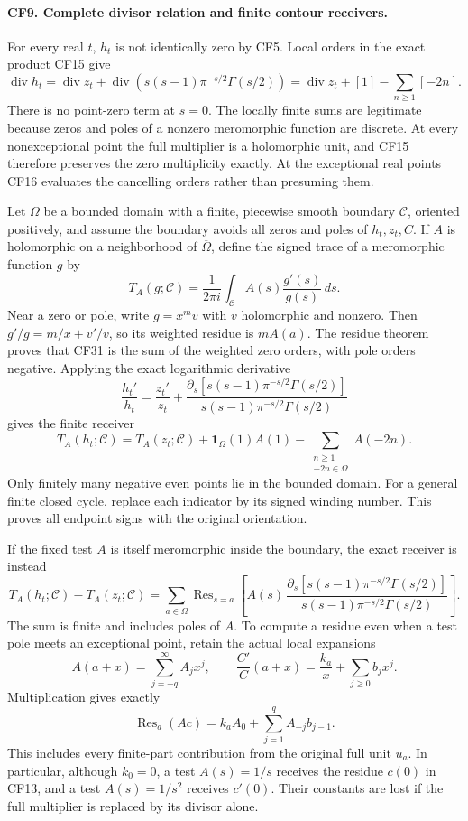 \paragraph{CF9. Complete divisor relation and finite contour receivers.}
For every real \(t\), \(h_t\) is not identically zero
by CF5. Local orders in the exact product CF15 give
\[
 \operatorname{div}h_t
 =\operatorname{div}z_t+
  \operatorname{div}\!\left(s(s-1)\pi^{-s/2}\Gamma(s/2)\right)
 =\operatorname{div}z_t+[1]-\sum_{n\ge1}[-2n].
 \tag{CF30}
\]
There is no point-zero term at \(s=0\).
The locally finite sums are legitimate because zeros
and poles of a nonzero meromorphic function are
discrete. At every nonexceptional point the full
multiplier is a holomorphic unit, and CF15 therefore
preserves the zero multiplicity exactly. At the
exceptional real points CF16 evaluates the cancelling
orders rather than presuming them.

Let \(\Omega\) be a bounded domain with a finite,
piecewise smooth boundary \(\mathcal C\), oriented
positively, and assume the boundary avoids all zeros
and poles of \(h_t,z_t,C\).
If \(A\) is holomorphic on a neighborhood of
\(\overline\Omega\), define the signed trace of a
meromorphic function \(g\) by
\[
 T_A(g;\mathcal C)=\frac1{2\pi i}\int_{\mathcal C}
              A(s)\frac{g'(s)}{g(s)}\,ds.
 \tag{CF31}
\]
Near a zero or pole, write \(g=x^m v\) with \(v\)
holomorphic and nonzero. Then \(g'/g=m/x+v'/v\),
so its weighted residue is \(mA(a)\). The residue
theorem proves that CF31 is the sum of the weighted
zero orders, with pole orders negative. Applying the
exact logarithmic derivative
\[
 \frac{h_t'}{h_t}
 =\frac{z_t'}{z_t}
  +\frac{\partial_s[s(s-1)\pi^{-s/2}\Gamma(s/2)]}
         {s(s-1)\pi^{-s/2}\Gamma(s/2)}
\]
gives the finite receiver
\[
 T_A(h_t;\mathcal C)
 =T_A(z_t;\mathcal C)
   +\mathbf1_\Omega(1)A(1)
   -\sum_{\substack{n\ge1\\-2n\in\Omega}}A(-2n).
 \tag{CF32}
\]
Only finitely many negative even points lie in the
bounded domain. For a general finite closed cycle,
replace each indicator by its signed winding number.
This proves all endpoint signs with the original
orientation.

If the fixed test \(A\) is itself meromorphic inside
the boundary, the exact receiver is instead
\[
 T_A(h_t;\mathcal C)-T_A(z_t;\mathcal C)
 =\sum_{a\in\Omega}
   \operatorname{Res}_{s=a}
   \left[
   A(s)\,
   \frac{\partial_s[s(s-1)\pi^{-s/2}\Gamma(s/2)]}
        {s(s-1)\pi^{-s/2}\Gamma(s/2)}
   \right].
 \tag{CF33}
\]
The sum is finite and includes poles of \(A\).
To compute a residue even when a test pole meets an
exceptional point, retain the actual local expansions
\[
 A(a+x)=\sum_{j=-q}^{\infty}A_jx^j,\qquad
 \frac{C'}C(a+x)=\frac{k_a}{x}
                     +\sum_{j\ge0}b_jx^j .
\]
Multiplication gives exactly
\[
 \operatorname{Res}_{a}(Ac)
 =k_a A_0+\sum_{j=1}^{q} A_{-j}b_{j-1}.
 \tag{CF34}
\]
This includes every finite-part contribution from
the original full unit \(u_a\).
In particular, although \(k_0=0\), a test \(A(s)=1/s\)
receives the residue \(c(0)\) in CF13, and a test
\(A(s)=1/s^2\) receives \(c'(0)\).
Their constants are lost if the full multiplier is
replaced by its divisor alone.

